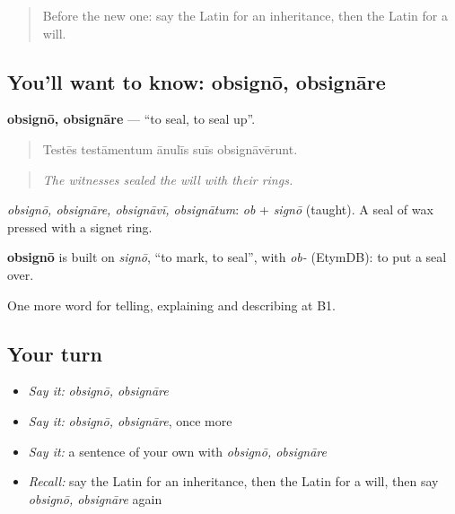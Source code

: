 \label{lesson:LA-C332-obsigno}



\begin{quote}
Before the new one: say the Latin for an inheritance, then the Latin for a will.
\end{quote}

\subsection*{You'll want to know: obsignō, obsignāre}
\textbf{obsignō, obsignāre} — \textquotedblleft{}to seal, to seal up\textquotedblright{}.

\begin{quote}
Testēs testāmentum ānulīs suīs obsignāvērunt.
\end{quote}

\begin{quote}
\emph{The witnesses sealed the will with their rings.}
\end{quote}

\emph{obsignō, obsignāre, obsignāvī, obsignātum}: \emph{ob} + \emph{signō} (taught). A seal of wax pressed with a signet ring.

\begin{cousinweb}
\textbf{obsignō} is built on \emph{signō}, \textquotedblleft{}to mark, to seal\textquotedblright{}, with \emph{ob-} (EtymDB): to put a seal over.
\end{cousinweb}

\begin{grammarlens}[title={What you've built}]
One more word for telling, explaining and describing at B1.
\end{grammarlens}

\subsection*{Your turn}
\begin{itemize}
\raggedright
  \item \emph{Say it:} \emph{obsignō, obsignāre}
  \item \emph{Say it:} \emph{obsignō, obsignāre}, once more
  \item \emph{Say it:} a sentence of your own with \emph{obsignō, obsignāre}
  \item \emph{Recall:} say the Latin for an inheritance, then the Latin for a will, then say \emph{obsignō, obsignāre} again
\end{itemize}

